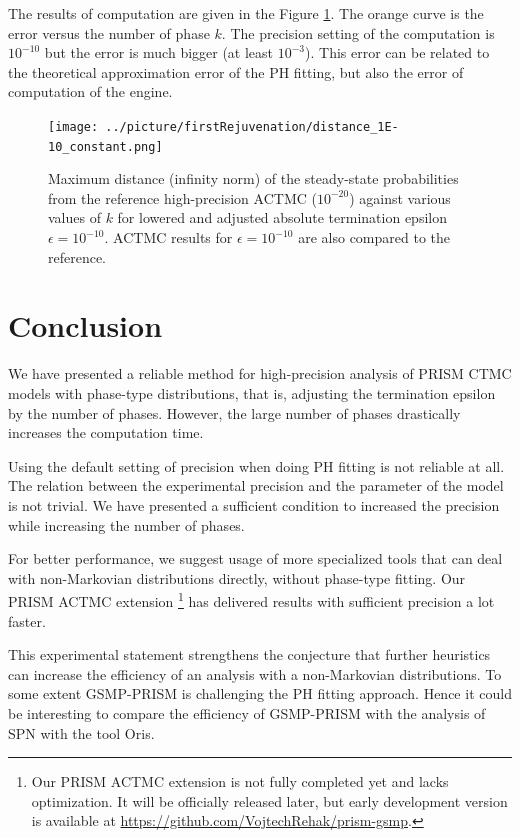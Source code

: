 \documentclass[runningheads,custombib]{llncs}
\begin{document}
	The results of computation are given in the Figure \ref{fig:fr_1E-10_constant}. The orange curve is the error versus the number of phase $k$. The precision setting of the computation is $10^{-10}$ but the error is much bigger (at least $10^{-3}$). This error can be related to the theoretical approximation error of the PH fitting, but also the error of computation of the engine.
	\begin{figure}[H]
		\begin{center}
			\texttt{[image: ../picture/firstRejuvenation/distance\_1E-10\_constant.png]}
		\end{center}
		\caption{Maximum distance (infinity norm) of the steady-state probabilities from the reference high-precision ACTMC ($10^{-20}$) against various values of $k$ for lowered and adjusted absolute termination epsilon $\epsilon = 10^{-10}$. ACTMC results for $\epsilon = 10^{-10}$ are also compared to the reference.}
		\label{fig:fr_1E-10_constant}
	\end{figure}
	
	\section{Conclusion}
	
	
	
	We have presented a reliable method for high-precision analysis of PRISM CTMC models with phase-type distributions, that is, adjusting the termination epsilon by the number of phases. However, the large number of phases drastically increases the computation time.
	
	Using the default setting of precision when doing PH fitting is not reliable at all. The relation between the experimental precision and the parameter of the model is not trivial. We have presented a sufficient condition to increased the precision while increasing the number of phases. 
	
	For better performance, we suggest usage of more specialized tools that can deal with non-Markovian distributions directly, without phase-type fitting. Our PRISM ACTMC extension \footnote{Our PRISM ACTMC extension is not fully completed yet and lacks optimization. It will be officially released later, but early development version is available at \href{https://github.com/VojtechRehak/prism-gsmp}{https://github.com/VojtechRehak/prism-gsmp}.} has delivered results with sufficient precision a lot faster.
	
	This experimental statement strengthens the conjecture that further heuristics can increase the efficiency of an analysis with a non-Markovian distributions\cite{DBLP:journals/corr/KorenciakKR14}. To some extent GSMP-PRISM is challenging the PH fitting approach. Hence it could be interesting to compare the efficiency of GSMP-PRISM with the analysis of SPN with the tool Oris.
	
\end{document}
